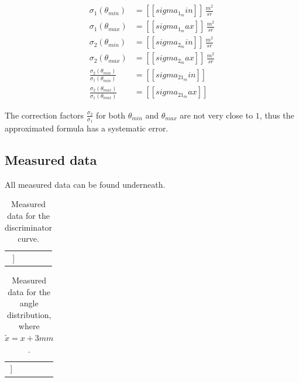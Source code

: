 \documentclass[a4paper]{article}
\begin{document}
\begin{align}
\sigma_1(\theta_{min}) &= [[sigma_1_min]] \, \frac{m^2}{sr} \\
\sigma_1(\theta_{max}) &= [[sigma_1_max]] \, \frac{m^2}{sr} \\
\sigma_2(\theta_{min}) &= [[sigma_2_min]] \, \frac{m^2}{sr} \\
\sigma_2(\theta_{max}) &= [[sigma_2_max]] \, \frac{m^2}{sr} \\
\frac{\sigma_2(\theta_{min})}{\sigma_1(\theta_{min})} &= [[sigma_21_min]] \\
\frac{\sigma_2(\theta_{max})}{\sigma_1(\theta_{max})} &= [[sigma_21_max]]
\end{align}

The correction factors $\frac{\sigma_2}{\sigma_1}$ for both $\theta_{min}$ and $\theta_{max}$ are not very close to $1$, thus the approximated formula has a systematic error.

\subsection{Measured data}

All measured data can be found underneath.
\newline

\begin{table}[H]
\centering
\begin{tabular}{r|rr|r}
\hline
[[table:discriminatorCurve]]
\end{tabular}
\caption{Measured data for the discriminator curve.}
\end{table}

\begin{table}[H]
\centering
\begin{tabular}{rr|rr|r}
\hline
[[table:angleDistribution]]
\end{tabular}
\caption{Measured data for the angle distribution, where $\tilde{x} = x + 3mm$.}
\end{table}
\end{document}
